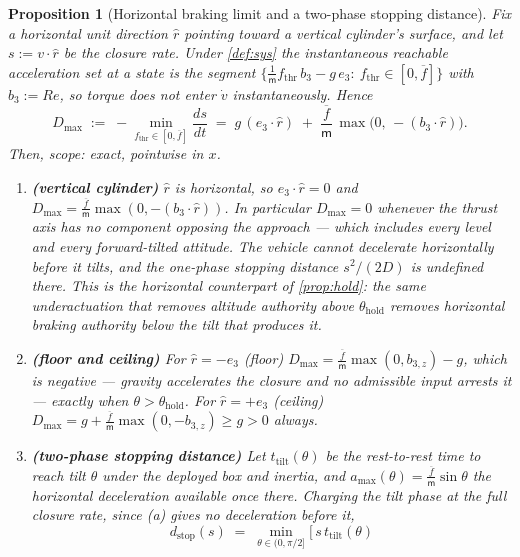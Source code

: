 \documentclass[11pt]{article}
\theoremstyle{plain}
\newtheorem{proposition}[theorem]{Proposition}
\theoremstyle{definition}
\theoremstyle{remark}
\newcommand{\mass}{\mathsf m}
\newcommand{\eqdef}{:=}
\begin{document}
\begin{proposition}[Horizontal braking limit and a two-phase stopping distance]\label{prop:hstop}
Fix a horizontal unit direction $\hat r$ pointing toward a vertical cylinder's surface, and let
$s\eqdef v\cdot\hat r$ be the closure rate. Under \cref{def:sys} the instantaneous reachable
acceleration set at a state is the segment $\{\tfrac{1}{\mass}f_{\mathrm{thr}}\,b_3-g\,e_3:\
f_{\mathrm{thr}}\in[0,\overline f]\}$ with $b_3\eqdef Re$, so torque does not enter
$\dot v$ instantaneously. Hence
\begin{equation}\label{eq:dmax}
D_{\max}\;\eqdef\;-\min_{f_{\mathrm{thr}}\in[0,\overline f]}\frac{d s}{dt}
\;=\; g\,(e_3\cdot\hat r)\;+\;\frac{\overline f}{\mass}\,\max\!\big(0,\,-(b_3\cdot\hat r)\big).
\end{equation}
Then, scope: exact, pointwise in $x$.
\begin{enumerate}[label=(\alph*)]
  \item \textbf{(vertical cylinder)} $\hat r$ is horizontal, so $e_3\cdot\hat r=0$ and
  $D_{\max}=\tfrac{\overline f}{\mass}\max(0,-(b_3\cdot\hat r))$. In particular $D_{\max}=0$
  whenever the thrust axis has no component opposing the approach --- which includes every
  level and every forward-tilted attitude. \emph{The vehicle cannot decelerate horizontally
  before it tilts}, and the one-phase stopping distance $s^2/(2D)$ is undefined there. This is
  the horizontal counterpart of \cref{prop:hold}: the same underactuation that removes altitude
  authority above $\theta_{\mathrm{hold}}$ removes horizontal braking authority below the tilt
  that produces it.
  \item \textbf{(floor and ceiling)} For $\hat r=-e_3$ (floor) $D_{\max}=\tfrac{\overline
  f}{\mass}\max(0,b_{3,z})-g$, which is negative --- gravity accelerates the closure and no
  admissible input arrests it --- exactly when $\theta>\theta_{\mathrm{hold}}$. For
  $\hat r=+e_3$ (ceiling) $D_{\max}=g+\tfrac{\overline f}{\mass}\max(0,-b_{3,z})\ge g>0$ always.
  \item \textbf{(two-phase stopping distance)} Let $t_{\mathrm{tilt}}(\theta)$ be the rest-to-rest
  time to reach tilt $\theta$ under the deployed box and inertia, and
  $a_{\max}(\theta)=\tfrac{\overline f}{\mass}\sin\theta$ the horizontal deceleration available
  once there. Charging the tilt phase at the full closure rate, since (a) gives no deceleration
  before it,
  \begin{equation}\label{eq:dstop}
  d_{\mathrm{stop}}(s)\;=\;\min_{\theta\in(0,\pi/2]}\Big[\,s\,t_{\mathrm{tilt}}(\theta)

\end{equation}
\end{enumerate}
\end{proposition}
\end{document}
